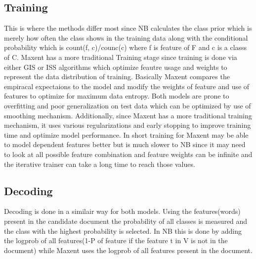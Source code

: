 \documentclass[11pt]{article}
\begin{document}
\subsection{Training}
This is where the methods differ most since NB calculates the class prior which is merely how often the class shows in the training data along with the conditional probability which is count(f, c)/counc(c) where f is feature of F and c is a classs of C.  Maxent has a more traditional Training stage since training is done via either GIS or ISS algorithms which optimize feautre usage and weights to represent the data distribution of training. Basically Maxent compares the empiracal expectaions to the model and modify the weights of feature and use of features to optimize for maximum data entropy. Both models are prone to overfitting and poor generalization on test data which can be optimized by use of smoothing mechanism. Additionally, since Maxent has a more traditional training mechanism, it uses various regularizations and early stopping to improve training time and optimize model performance. In short training for Maxent may be able to model dependent features better but is much slower to NB since it may need to look at all possible feature combination and feature weights can be infinite and the iterative trainer can take a long time to reach those values.
\subsection{Decoding}
Decoding is done in a similair way for both models. Using the features(words) present in the candidate document the probability of all classes is measured and the class with the highest probability is selected. In NB this is done by adding the logprob of all features(1-P of feature if the feature t in V is not in the document) while Maxent uses the logprob of all features present in the document.
\end{document}
